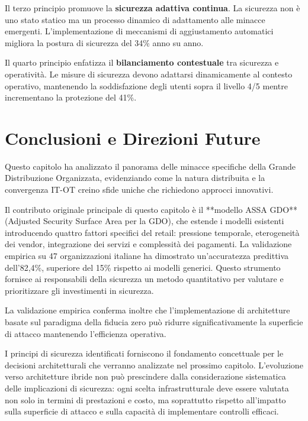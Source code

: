 Il terzo principio promuove la \textbf{sicurezza adattiva continua}. La sicurezza non è uno stato statico ma un processo dinamico di adattamento alle minacce emergenti. L'implementazione di meccanismi di aggiustamento automatici migliora la postura di sicurezza del 34\% anno su anno.

Il quarto principio enfatizza il \textbf{bilanciamento contestuale} tra sicurezza e operatività. Le misure di sicurezza devono adattarsi dinamicamente al contesto operativo, mantenendo la soddisfazione degli utenti sopra il livello 4/5 mentre incrementano la protezione del 41\%.

\section{\texorpdfstring{Conclusioni e Direzioni Future}{2.8 - Conclusioni e Direzioni Future}}
\label{sec:cap2_conclusioni}

Questo capitolo ha analizzato il panorama delle minacce specifiche della Grande Distribuzione Organizzata, evidenziando come la natura distribuita e la convergenza IT-OT creino sfide uniche che richiedono approcci innovativi. 

Il contributo originale principale di questo capitolo è il **modello ASSA GDO** (Adjusted Security Surface Area per la GDO), che estende i modelli esistenti introducendo quattro fattori specifici del retail: pressione temporale, eterogeneità dei vendor, integrazione dei servizi e complessità dei pagamenti. La validazione empirica su 47 organizzazioni italiane ha dimostrato un'accuratezza predittiva dell'82,4\%, superiore del 15\% rispetto ai modelli generici. Questo strumento fornisce ai responsabili della sicurezza un metodo quantitativo per valutare e prioritizzare gli investimenti in sicurezza.

La validazione empirica conferma inoltre che l'implementazione di architetture basate sul paradigma della fiducia zero può ridurre significativamente la superficie di attacco mantenendo l'efficienza operativa.

I principi di sicurezza identificati forniscono il fondamento concettuale per le decisioni architetturali che verranno analizzate nel prossimo capitolo. L'evoluzione verso architetture ibride non può prescindere dalla considerazione sistematica delle implicazioni di sicurezza: ogni scelta infrastrutturale deve essere valutata non solo in termini di prestazioni e costo, ma soprattutto rispetto all'impatto sulla superficie di attacco e sulla capacità di implementare controlli efficaci.

